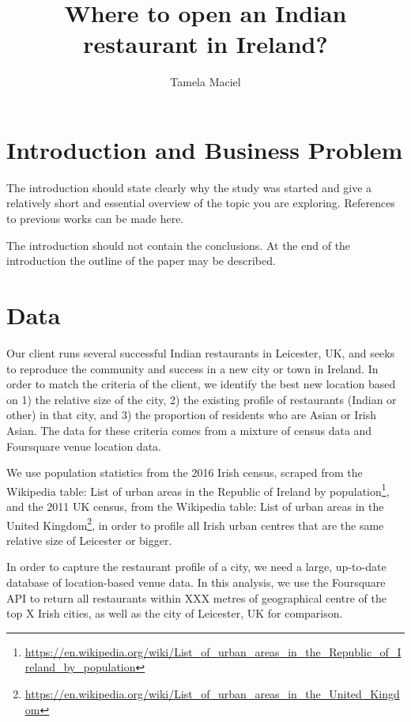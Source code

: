 \documentclass[a4paper,10pt]{article}
\begin{document}
%
   \title{Where to open an Indian restaurant in Ireland?}

   \author{Tamela Maciel}
          
   \date{}

   \maketitle
   
 

\section{Introduction and Business Problem}
The introduction should state clearly why the study was started
and give a relatively short and essential overview of the topic
you are exploring. References to previous works can be made here.
 
The introduction should not contain the conclusions. 
At the end of the introduction the outline of the paper may be described.
 
 
\section{Data}
Our client runs several successful Indian restaurants in Leicester, UK, and seeks to reproduce the community and success in a new city or town in Ireland. In order to match the criteria of the client, we identify the best new location based on 1) the relative size of the city, 2) the existing profile of restaurants (Indian or other) in that city, and 3) the proportion of residents who are Asian or Irish Asian. The data for these criteria comes from a mixture of census data and Foursquare venue location data.

We use population statistics from the 2016 Irish census, scraped from the Wikipedia table: List of urban areas in the Republic of Ireland by population\footnote{\url{https://en.wikipedia.org/wiki/List_of_urban_areas_in_the_Republic_of_Ireland_by_population}}, and the 2011 UK census, from the Wikipedia table: List of urban areas in the United Kingdom\footnote{\url{https://en.wikipedia.org/wiki/List_of_urban_areas_in_the_United_Kingdom}}, in order to profile all Irish urban centres that are the same relative size of Leicester or bigger.

In order to capture the restaurant profile of a city, we need a large, up-to-date database of location-based venue data. In this analysis, we use the Foursquare API to return all restaurants within XXX metres of geographical centre of the top X Irish cities, as well as the city of Leicester, UK for comparison.
\end{document}
